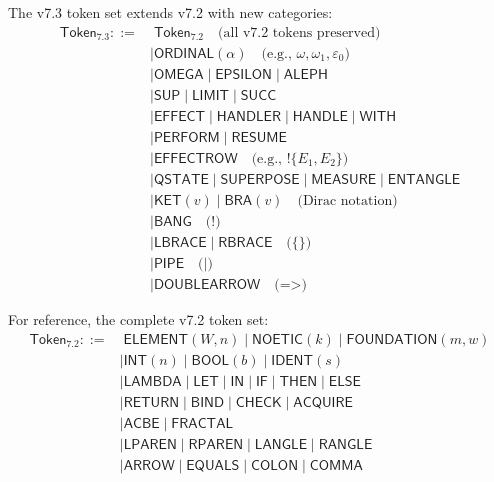 \begin{definition}
\label{def:token-set-v73}
The v7.3 token set extends v7.2 with new categories:
\begin{align}
\mathsf{Token}_{7.3} ::=&\; \mathsf{Token}_{7.2} \quad \text{(all v7.2 tokens preserved)} \\[1ex]
    &\mid \mathsf{ORDINAL}(\alpha) \quad \text{(e.g., } \omega, \omega_1, \varepsilon_0\text{)} \\
    &\mid \mathsf{OMEGA} \mid \mathsf{EPSILON} \mid \mathsf{ALEPH} \\
    &\mid \mathsf{SUP} \mid \mathsf{LIMIT} \mid \mathsf{SUCC} \\[1ex]
    &\mid \mathsf{EFFECT} \mid \mathsf{HANDLER} \mid \mathsf{HANDLE} \mid \mathsf{WITH} \\
    &\mid \mathsf{PERFORM} \mid \mathsf{RESUME} \\
    &\mid \mathsf{EFFECTROW} \quad \text{(e.g., } !\{E_1, E_2\}\text{)} \\[1ex]
    &\mid \mathsf{QSTATE} \mid \mathsf{SUPERPOSE} \mid \mathsf{MEASURE} \mid \mathsf{ENTANGLE} \\
    &\mid \mathsf{KET}(v) \mid \mathsf{BRA}(v) \quad \text{(Dirac notation)} \\[1ex]
    &\mid \mathsf{BANG} \quad \text{(!)} \\
    &\mid \mathsf{LBRACE} \mid \mathsf{RBRACE} \quad \text{(\{\})} \\
    &\mid \mathsf{PIPE} \quad \text{(|)} \\
    &\mid \mathsf{DOUBLEARROW} \quad \text{(=>)}
\end{align}
\end{definition}

\begin{definition}
\label{def:token-set-v72-preserved}
For reference, the complete v7.2 token set:
\begin{align}
\mathsf{Token}_{7.2} ::=&\; \mathsf{ELEMENT}(W, n) \mid \mathsf{NOETIC}(k) \mid \mathsf{FOUNDATION}(m, w) \\
    &\mid \mathsf{INT}(n) \mid \mathsf{BOOL}(b) \mid \mathsf{IDENT}(s) \\
    &\mid \mathsf{LAMBDA} \mid \mathsf{LET} \mid \mathsf{IN} \mid \mathsf{IF} \mid \mathsf{THEN} \mid \mathsf{ELSE} \\
    &\mid \mathsf{RETURN} \mid \mathsf{BIND} \mid \mathsf{CHECK} \mid \mathsf{ACQUIRE} \\
    &\mid \mathsf{ACBE} \mid \mathsf{FRACTAL} \\
    &\mid \mathsf{LPAREN} \mid \mathsf{RPAREN} \mid \mathsf{LANGLE} \mid \mathsf{RANGLE} \\
    &\mid \mathsf{ARROW} \mid \mathsf{EQUALS} \mid \mathsf{COLON} \mid \mathsf{COMMA}
\end{align}
\end{definition}

